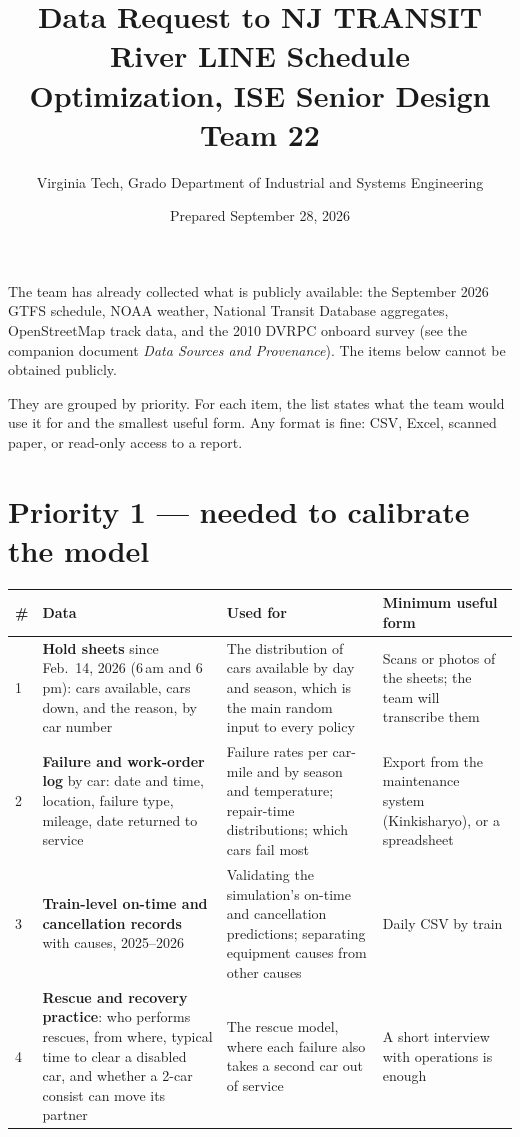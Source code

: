 \documentclass[11pt]{article}
\title{Data Request to NJ TRANSIT\\\large River LINE Schedule Optimization, ISE Senior Design Team 22}
\author{Virginia Tech, Grado Department of Industrial and Systems Engineering}
\date{Prepared September 28, 2026}
\begin{document}
\maketitle

\noindent The team has already collected what is publicly available: the September 2026 GTFS schedule, NOAA weather, National Transit Database aggregates, OpenStreetMap track data, and the 2010 DVRPC onboard survey (see the companion document \emph{Data Sources and Provenance}). The items below cannot be obtained publicly.

They are grouped by priority. For each item, the list states what the team would use it for and the smallest useful form. Any format is fine: CSV, Excel, scanned paper, or read-only access to a report.

\section*{Priority 1 --- needed to calibrate the model}
\begin{longtable}{@{}p{0.5cm}p{5.3cm}p{5.2cm}p{3.6cm}@{}}
\toprule
\# & Data & Used for & Minimum useful form \\
\midrule\endhead
1 & \textbf{Hold sheets} since Feb.~14, 2026 (6\,am and 6\,pm): cars available, cars down, and the reason, by car number & The distribution of cars available by day and season, which is the main random input to every policy & Scans or photos of the sheets; the team will transcribe them \\
2 & \textbf{Failure and work-order log} by car: date and time, location, failure type, mileage, date returned to service & Failure rates per car-mile and by season and temperature; repair-time distributions; which cars fail most & Export from the maintenance system (Kinkisharyo), or a spreadsheet \\
3 & \textbf{Train-level on-time and cancellation records} with causes, 2025--2026 & Validating the simulation's on-time and cancellation predictions; separating equipment causes from other causes & Daily CSV by train \\
4 & \textbf{Rescue and recovery practice}: who performs rescues, from where, typical time to clear a disabled car, and whether a 2-car consist can move its partner & The rescue model, where each failure also takes a second car out of service & A short interview with operations is enough \\
\bottomrule
\end{longtable}
\end{document}
